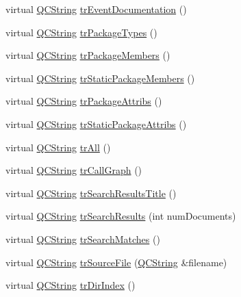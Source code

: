 \begin{DoxyCompactItemize}
virtual \mbox{\hyperlink{class_q_c_string}{Q\+C\+String}} \mbox{\hyperlink{class_translator_arabic_a32c79069b0baf68aa960fb12e5eccf69}{tr\+Event\+Documentation}} ()
\item 
virtual \mbox{\hyperlink{class_q_c_string}{Q\+C\+String}} \mbox{\hyperlink{class_translator_arabic_a33836a76c01621404a4a1c6dd75193b8}{tr\+Package\+Types}} ()
\item 
virtual \mbox{\hyperlink{class_q_c_string}{Q\+C\+String}} \mbox{\hyperlink{class_translator_arabic_a8ad719e5ac01f9436a1030e353ff87ba}{tr\+Package\+Members}} ()
\item 
virtual \mbox{\hyperlink{class_q_c_string}{Q\+C\+String}} \mbox{\hyperlink{class_translator_arabic_a9196ff5e4aec8c51f04d2ab7ce81b911}{tr\+Static\+Package\+Members}} ()
\item 
virtual \mbox{\hyperlink{class_q_c_string}{Q\+C\+String}} \mbox{\hyperlink{class_translator_arabic_a3fb7e1777720ff1ab10aaeee75dd2a2a}{tr\+Package\+Attribs}} ()
\item 
virtual \mbox{\hyperlink{class_q_c_string}{Q\+C\+String}} \mbox{\hyperlink{class_translator_arabic_ae21911cb6b577cae069bdb9a402b8513}{tr\+Static\+Package\+Attribs}} ()
\item 
virtual \mbox{\hyperlink{class_q_c_string}{Q\+C\+String}} \mbox{\hyperlink{class_translator_arabic_ab25ba70bda04768d6c1a31414567f973}{tr\+All}} ()
\item 
virtual \mbox{\hyperlink{class_q_c_string}{Q\+C\+String}} \mbox{\hyperlink{class_translator_arabic_a653f65a872ca15cf8b8cc117819f6ba1}{tr\+Call\+Graph}} ()
\item 
virtual \mbox{\hyperlink{class_q_c_string}{Q\+C\+String}} \mbox{\hyperlink{class_translator_arabic_a375288f06fd49370b8b1c04af4a759c5}{tr\+Search\+Results\+Title}} ()
\item 
virtual \mbox{\hyperlink{class_q_c_string}{Q\+C\+String}} \mbox{\hyperlink{class_translator_arabic_adf073ad76dbfbcad593352948d763937}{tr\+Search\+Results}} (int num\+Documents)
\item 
virtual \mbox{\hyperlink{class_q_c_string}{Q\+C\+String}} \mbox{\hyperlink{class_translator_arabic_ad66d22bab94edf3ea99999c5348e8ab0}{tr\+Search\+Matches}} ()
\item 
virtual \mbox{\hyperlink{class_q_c_string}{Q\+C\+String}} \mbox{\hyperlink{class_translator_arabic_ae231bc0da0b0a5c1cfba86363bcbf444}{tr\+Source\+File}} (\mbox{\hyperlink{class_q_c_string}{Q\+C\+String}} \&filename)
\item 
virtual \mbox{\hyperlink{class_q_c_string}{Q\+C\+String}} \mbox{\hyperlink{class_translator_arabic_a2ef6949ec9de4479e48b911a97821b94}{tr\+Dir\+Index}} ()

\end{DoxyCompactItemize}

